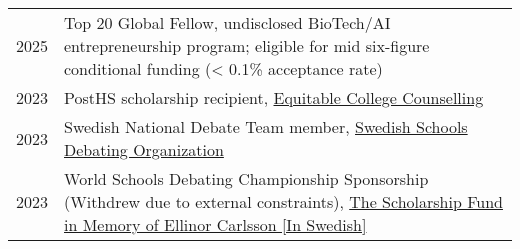 \begin{longtable}[l]{@{}p{} p{}}

    2025 & Top 20 Global Fellow, undisclosed BioTech/AI entrepreneurship program; eligible for mid six-figure conditional funding (< 0.1\% acceptance rate)\\

    2023 & PostHS scholarship recipient, \href{https://www.linkedin.com/company/posths/posts/?feedView=all}{Equitable College Counselling}\\
   
    2023 & Swedish National Debate Team member, \href{https://www.linkedin.com/in/pntmangondo/}{Swedish Schools Debating Organization} \\

    2023 & World Schools Debating Championship Sponsorship (Withdrew due to external constraints), \href{https://www.ellinorsstipendiefond.se/}{The Scholarship Fund in Memory of Ellinor Carlsson [In Swedish]}
   
\end{longtable}
